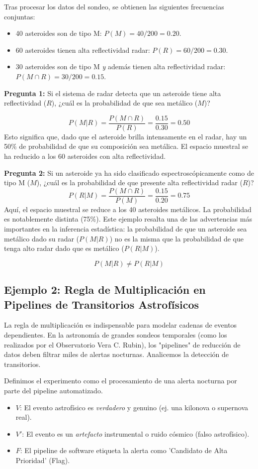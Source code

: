 Tras procesar los datos del sondeo, se obtienen las siguientes frecuencias conjuntas:
\begin{itemize}
    \item 40 asteroides son de tipo M: $P(M) = 40/200 = 0.20$.
    \item 60 asteroides tienen alta reflectividad radar: $P(R) = 60/200 = 0.30$.
    \item 30 asteroides son de tipo M \textit{y} además tienen alta reflectividad radar: $P(M \cap R) = 30/200 = 0.15$.
\end{itemize}

\textbf{Pregunta 1:} Si el sistema de radar detecta que un asteroide tiene alta reflectividad ($R$), ¿cuál es la probabilidad de que sea metálico ($M$)?

$$ P(M|R) = \frac{P(M \cap R)}{P(R)} = \frac{0.15}{0.30} = 0.50 $$
Esto significa que, dado que el asteroide brilla intensamente en el radar, hay un 50\% de probabilidad de que su composición sea metálica. El espacio muestral se ha reducido a los 60 asteroides con alta reflectividad.

\textbf{Pregunta 2:} Si un asteroide ya ha sido clasificado espectroscópicamente como de tipo M ($M$), ¿cuál es la probabilidad de que presente alta reflectividad radar ($R$)?
$$ P(R|M) = \frac{P(M \cap R)}{P(M)} = \frac{0.15}{0.20} = 0.75 $$
Aquí, el espacio muestral se reduce a los 40 asteroides metálicos. La probabilidad es notablemente distinta (75\%). Este ejemplo resalta una de las advertencias más importantes en la inferencia estadística: la probabilidad de que un asteroide sea metálico dado su radar ($P(M|R)$) no es la misma que la probabilidad de que tenga alto radar dado que es metálico ($P(R|M)$).

$$P(M|R)\neq P(R|M)$$

\subsection{Ejemplo 2: Regla de Multiplicación en Pipelines de Transitorios Astrofísicos}

La regla de multiplicación es indispensable para modelar cadenas de eventos dependientes. En la astronomía de grandes sondeos temporales (como los realizados por el Observatorio Vera C. Rubin), los "pipelines" de reducción de datos deben filtrar miles de alertas nocturnas. Analicemos la detección de transitorios.

Definimos el experimento como el procesamiento de una alerta nocturna por parte del pipeline automatizado.
\begin{itemize}
    \item $V$: El evento astrofísico es \textit{verdadero} y genuino (ej. una kilonova o supernova real).
    \item $V'$: El evento es un \textit{artefacto} instrumental o ruido cósmico (falso astrofísico).
    \item $F$: El pipeline de software etiqueta la alerta como 'Candidato de Alta Prioridad' (Flag).
\end{itemize}

